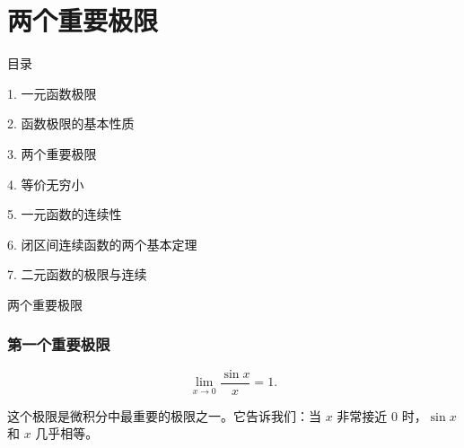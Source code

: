 \documentclass[aspectratio=169,10pt,fontset=fandol]{ctexbeamer}
\newenvironment{custom}[1]{\par\noindent\textbf{#1}\quad}{\par\vspace{0.8em}}
\begin{document}
\section{两个重要极限}
\begin{frame}[t,fragile]{目录}
\normalsize
{\color{black}\normalsize 1. 一元函数极限\par}\vspace{0.22em}
{\color{black}\normalsize 2. 函数极限的基本性质\par}\vspace{0.22em}
{\color{blue}\normalsize 3. 两个重要极限\par}\vspace{0.22em}
{\color{gray!40}\normalsize 4. 等价无穷小\par}\vspace{0.22em}
{\color{gray!40}\normalsize 5. 一元函数的连续性\par}\vspace{0.22em}
{\color{gray!40}\normalsize 6. 闭区间连续函数的两个基本定理\par}\vspace{0.22em}
{\color{gray!40}\normalsize 7. 二元函数的极限与连续\par}\vspace{0.22em}
\end{frame}
\begin{frame}[t,fragile]{两个重要极限}
\normalsize
{\normalsize
\subsubsection*{第一个重要极限}


}
{\normalsize
\[
\lim_{x \to 0} \frac{\sin x}{x} = 1.
\]


}
{\normalsize
这个极限是微积分中最重要的极限之一。它告诉我们：当 \(x\) 非常接近 0 时，\(\sin x\) 和 \(x\) 几乎相等。


}
\end{frame}
\end{document}

